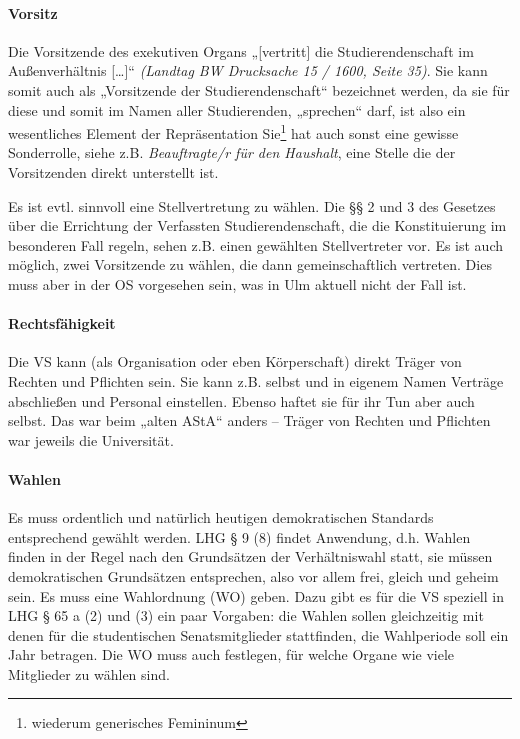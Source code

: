 \documentclass[
10pt,
a4paper,
twoside,								%
titlepage=false,							%
draft=false								%
]{scrartcl}
\begin{document}
\paragraph{Vorsitz}

Die Vorsitzende des exekutiven Organs „[vertritt] die Studierendenschaft im Außenverhältnis […]“ \textit{(Landtag BW Drucksache 15 / 1600, Seite 35)}. Sie kann somit auch als „Vorsitzende der Studierendenschaft“ bezeichnet werden, da sie für diese und somit im Namen aller Studierenden, „sprechen“ darf, ist also ein wesentliches Element der Repräsentation Sie\footnote{wiederum generisches Femininum} hat auch sonst eine gewisse Sonderrolle, siehe z.B. \emph{Beauftragte/r für den Haushalt}, eine Stelle die der Vorsitzenden direkt unterstellt ist.

Es ist evtl. sinnvoll eine Stellvertretung zu wählen. Die §§ 2 und 3 des Gesetzes über die Errichtung der Verfassten Studierendenschaft, die die Konstituierung im besonderen Fall regeln, sehen z.B. einen gewählten Stellvertreter vor. Es ist auch möglich, zwei Vorsitzende zu wählen, die dann gemeinschaftlich vertreten. Dies muss aber in der OS vorgesehen sein, was in Ulm aktuell nicht der Fall ist.



\paragraph{Rechtsfähigkeit}

Die VS kann (als Organisation oder eben Körperschaft) direkt Träger von Rechten und Pflichten sein. Sie kann z.B. selbst und in eigenem Namen Verträge abschließen und Personal einstellen. Ebenso haftet sie für ihr Tun aber auch selbst. Das war beim „alten AStA“ anders – Träger von Rechten und Pflichten war jeweils die Universität.



\paragraph{Wahlen}\label{Glossar: Wahlen}

Es muss ordentlich und natürlich heutigen demokratischen Standards entsprechend gewählt werden. LHG § 9 (8) findet Anwendung, d.h. Wahlen finden in der Regel nach den Grundsätzen der Verhältniswahl statt, sie müssen demokratischen Grundsätzen entsprechen, also vor allem frei, gleich und geheim sein. Es muss eine Wahlordnung (WO) geben. Dazu gibt es für die VS speziell in LHG § 65 a (2) und (3) ein paar Vorgaben: die Wahlen sollen gleichzeitig mit denen für die studentischen Senatsmitglieder stattfinden, die Wahlperiode soll ein Jahr betragen. Die WO muss auch festlegen, für welche Organe wie viele Mitglieder zu wählen sind.
\end{document}
